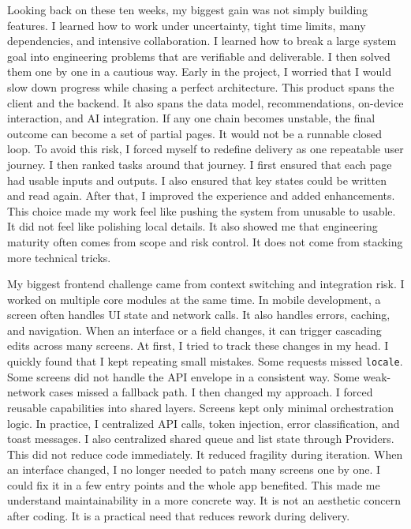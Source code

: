 \documentclass[journal]{IEEEtran}
\begin{document}
Looking back on these ten weeks, my biggest gain was not simply building features. I learned how to work under uncertainty, tight time limits, many dependencies, and intensive collaboration. I learned how to break a large system goal into engineering problems that are verifiable and deliverable. I then solved them one by one in a cautious way. Early in the project, I worried that I would slow down progress while chasing a perfect architecture. This product spans the client and the backend. It also spans the data model, recommendations, on-device interaction, and AI integration. If any one chain becomes unstable, the final outcome can become a set of partial pages. It would not be a runnable closed loop. To avoid this risk, I forced myself to redefine delivery as one repeatable user journey. I then ranked tasks around that journey. I first ensured that each page had usable inputs and outputs. I also ensured that key states could be written and read again. After that, I improved the experience and added enhancements. This choice made my work feel like pushing the system from unusable to usable. It did not feel like polishing local details. It also showed me that engineering maturity often comes from scope and risk control. It does not come from stacking more technical tricks.

My biggest frontend challenge came from context switching and integration risk. I worked on multiple core modules at the same time. In mobile development, a screen often handles UI state and network calls. It also handles errors, caching, and navigation. When an interface or a field changes, it can trigger cascading edits across many screens. At first, I tried to track these changes in my head. I quickly found that I kept repeating small mistakes. Some requests missed \texttt{locale}. Some screens did not handle the API envelope in a consistent way. Some weak-network cases missed a fallback path. I then changed my approach. I forced reusable capabilities into shared layers. Screens kept only minimal orchestration logic. In practice, I centralized API calls, token injection, error classification, and toast messages. I also centralized shared queue and list state through Providers. This did not reduce code immediately. It reduced fragility during iteration. When an interface changed, I no longer needed to patch many screens one by one. I could fix it in a few entry points and the whole app benefited. This made me understand maintainability in a more concrete way. It is not an aesthetic concern after coding. It is a practical need that reduces rework during delivery.
\end{document}
